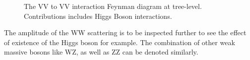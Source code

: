 \begin{figure}[tbp]
\begin{center}
\caption{
The VV to VV interaction Feynman diagram at tree-level. Contributions includes Higgs Boson interactions.
}
\label{fig:VBSHiggs}
\end{center}
\end{figure}


The amplitude of the WW scattering is to be inspected further to see the effect of existence of the Higgs boson for example. The combination of other weak massive bosons like WZ, as well as ZZ can be denoted similarly. 

